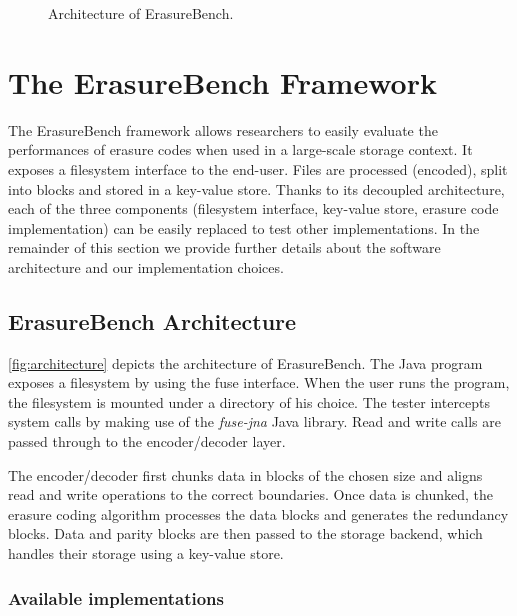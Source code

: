 \begin{figure}[t]
    \centering
    
    \caption{Architecture of ErasureBench.}
    \label{fig:architecture}
\end{figure}

\section{The ErasureBench Framework}
\label{sec:erasure-tester}

The ErasureBench framework allows researchers to easily evaluate the performances of erasure codes when used in a large-scale storage context.
It exposes a filesystem interface to the end-user.
Files are processed (encoded), split into blocks and stored in a key-value store.
Thanks to its decoupled architecture, each of the three components (filesystem interface, key-value store, erasure code implementation) can be easily replaced to test other implementations. 
In the remainder of this section we provide further details about the software architecture and our implementation choices.

\subsection{ErasureBench Architecture}
\label{subsec:architecture}

\autoref{fig:architecture} depicts the architecture of ErasureBench.
The Java program exposes a filesystem by using the \ac{fuse} interface. 
When the user runs the program, the filesystem is mounted under a directory of his choice. 
The tester intercepts system calls by making use of the \textit{fuse-jna} \autocite{fuse-jna} Java library. 
Read and write calls are passed through to the encoder/decoder layer.

The encoder/decoder first chunks data in blocks of the chosen size and aligns read and write operations to the correct boundaries. Once data is chunked, the erasure coding algorithm processes the data blocks and generates the redundancy blocks. Data and parity blocks are then passed to the storage backend, which handles their storage using a key-value store.

\subsubsection{Available implementations}

